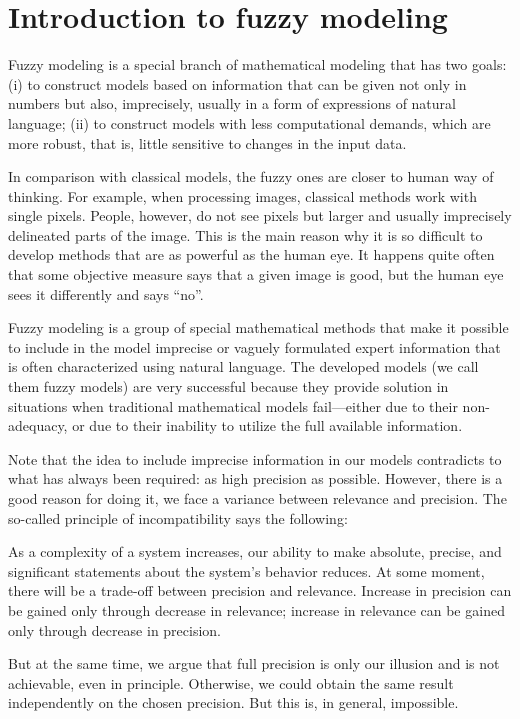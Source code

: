 \chapter{Introduction to fuzzy modeling}
Fuzzy modeling is a special branch of mathematical modeling that has two goals:
(i) to construct models based on information that can be given not only in numbers
but also, imprecisely, usually in a form of expressions of natural language; (ii) to
construct models with less computational demands, which are more robust, that is,
little sensitive to changes in the input data.

In comparison with classical models, the fuzzy ones are closer to human way of
thinking. For example, when processing images, classical methods work with single
pixels. People, however, do not see pixels but larger and usually imprecisely delineated parts of the image. This is the main reason why it is so difficult to develop
methods that are as powerful as the human eye. It happens quite often that some objective measure says that a given image is good, but the human eye sees it differently and
says “no”.

Fuzzy modeling is a group of special mathematical methods that make it possible to
include in the model imprecise or vaguely formulated expert information that is often
characterized using natural language. The developed models (we call them fuzzy
models) are very successful because they provide solution in situations when traditional mathematical models fail—either due to their non-adequacy, or due to their
inability to utilize the full available information.

Note that the idea to include imprecise information in our models contradicts to what has always been required: as high precision as possible. However, there is a good reason for doing it, we face a variance between relevance and precision. The so-called principle of incompatibility \cite{zadeh} says the following:

As a complexity of a system increases, our ability to make absolute, precise, and significant statements about the system's behavior reduces. At some moment, there will be a trade-off between precision and relevance. Increase in precision can be gained only through decrease in relevance; increase in relevance can be gained only through decrease in precision.

But at the same time, we argue that full precision is only our illusion and is not achievable, even in principle. Otherwise, we could obtain the same result independently on the chosen precision. But this is, in general, impossible. 

